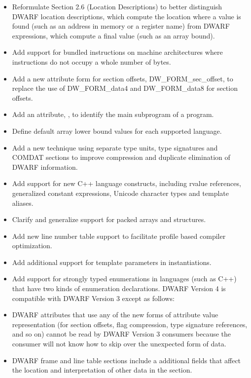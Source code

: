 \begin{itemize}

\item Reformulate 
Section 2.6 (Location Descriptions) 
to better distinguish DWARF location descriptions, which
compute the location where a value is found (such as an address in memory or a register
name) from DWARF expressions, which compute a final value (such as an array bound).
\item Add support for bundled instructions on machine architectures where instructions do not
occupy a whole number of bytes.
\item Add a new attribute form for section offsets, DW\-\_FORM\-\_sec\-\_offset, to replace the use
of DW\-\_FORM\-\_data4 and DW\-\_FORM\-\_data8 for section offsets.
\item Add an attribute, , to identify the main subprogram of a
program.
\item Define default array lower bound values for each supported language.
\item Add a new technique using separate type units, type signatures and COMDAT sections to
improve compression and duplicate elimination of DWARF information.
\item Add support for new C++ language constructs, including rvalue references, generalized
constant expressions, Unicode character types and template aliases.
\item Clarify and generalize support for packed arrays and structures.
\item Add new line number table support to facilitate profile based compiler optimization.
\item Add additional support for template parameters in instantiations.
\item Add support for strongly typed enumerations in languages (such as C++) that have two
kinds of enumeration declarations.
DWARF Version 4 is compatible with DWARF Version 3 except as follows:
\item DWARF attributes that use any of the new forms of attribute value representation (for
section offsets, flag compression, type signature references, and so on) cannot be read by
DWARF Version 3 consumers because the consumer will not know how to skip over the
unexpected form of data.
\item DWARF frame and line table sections include a additional fields that affect the location
and interpretation of other data in the section.
\end{itemize}


